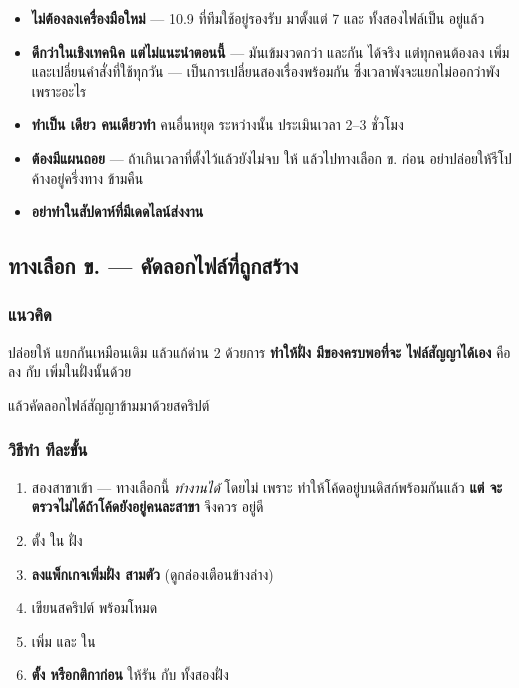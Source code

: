 \begin{itemize}
\item \textbf{ไม่ต้องลงเครื่องมือใหม่} ---  10.9 ที่ทีมใช้อยู่รองรับ
       มาตั้งแต่  7 และ 
      ทั้งสองไฟล์เป็น  อยู่แล้ว
\item \textbf{ ดีกว่าในเชิงเทคนิค แต่ไม่แนะนำตอนนี้} --- มันเข้มงวดกว่า
      และกัน  ได้จริง แต่ทุกคนต้องลง  เพิ่ม
      และเปลี่ยนคำสั่งที่ใช้ทุกวัน --- เป็นการเปลี่ยนสองเรื่องพร้อมกัน
      ซึ่งเวลาพังจะแยกไม่ออกว่าพังเพราะอะไร
\item \textbf{ทำเป็น  เดียว คนเดียวทำ} คนอื่นหยุด  ระหว่างนั้น
      ประเมินเวลา 2--3 ชั่วโมง
\item \textbf{ต้องมีแผนถอย} --- ถ้าเกินเวลาที่ตั้งไว้แล้วยังไม่จบ ให้
       แล้วไปทางเลือก ข. ก่อน อย่าปล่อยให้รีโปค้างอยู่ครึ่งทาง
      ข้ามคืน
\item \textbf{อย่าทำในสัปดาห์ที่มีเดดไลน์ส่งงาน}
\end{itemize}

\subsection{ทางเลือก ข. --- คัดลอกไฟล์ที่ถูกสร้าง}

\subsubsection{แนวคิด}

ปล่อยให้  แยกกันเหมือนเดิม แล้วแก้ด่าน 2 ด้วยการ
\textbf{ทำให้ฝั่ง  มีของครบพอที่จะ  ไฟล์สัญญาได้เอง}
คือลง  กับ  เพิ่มในฝั่งนั้นด้วย

แล้วคัดลอกไฟล์สัญญาข้ามมาด้วยสคริปต์

\subsubsection{วิธีทำ ทีละขั้น}

\begin{enumerate}
\item {} สองสาขาเข้า  --- ทางเลือกนี้ \emph{ทำงานได้} โดยไม่
       เพราะ  ทำให้โค้ดอยู่บนดิสก์พร้อมกันแล้ว
      \textbf{แต่  จะตรวจไม่ได้ถ้าโค้ดยังอยู่คนละสาขา} จึงควร  อยู่ดี
\item ตั้ง  ใน  ฝั่ง 
\item \textbf{ลงแพ็กเกจเพิ่มฝั่ง  สามตัว} (ดูกล่องเตือนข้างล่าง)
\item เขียนสคริปต์  พร้อมโหมด 
\item เพิ่ม  และ  ใน
\item \textbf{ตั้ง  หรือกติกาก่อน } ให้รัน
       กับ  ทั้งสองฝั่ง
\end{enumerate}

